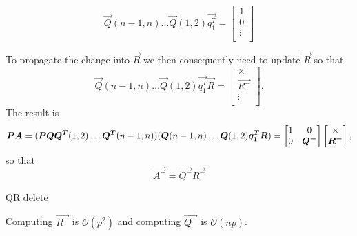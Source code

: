 \begin{equation}
    \vec{Q}(n-1,n) \ldots \vec{Q}(1,2)\vec{q_1^T} =     \begin{bmatrix}
        1 \\
        0\\
        \vdots \\
    \end{bmatrix}
\end{equation}

To propagate the change into $\vec{R}$ we then consequently need to update $\vec{R}$ so that
\begin{equation}
    \vec{Q}(n-1,n) \ldots \vec{Q}(1,2)\vec{q_1^T} \vec{R} =     \begin{bmatrix}
        \times \\
        \vec{R^{-}}\\
        \vdots \\
    \end{bmatrix}.
\end{equation}
The result is
\begin{equation}
    \vec{P}\vec{A} = (\vec{P}\vec{Q}  \vec{Q^T}(1,2) \ldots   \vec{Q^T}(n-1,n)) (\vec{Q}(n-1,n) \ldots \vec{Q}(1,2)\vec{q_1^T} \vec{R} ) \\
    = 
    \begin{bmatrix}
        1 & 0 \\
        0 & \vec{Q^{-}}
    \end{bmatrix}
    \begin{bmatrix}
        \times \\
        \vec{R^{-}}
    \end{bmatrix},
\end{equation}
so that 
\begin{equation}
    \vec{A^{-}} = \vec{Q^{-}}\vec{R^{-}}
\end{equation}

\begin{algorithm}[H]
    \label{removingrow}
      \caption{QR delete}

    \;
\end{algorithm}

Computing $\vec{R^{-}}$ is $\mathcal{O}(p^2)$ and computing $\vec{Q^{-}}$ is $\mathcal{O}(np)$.



